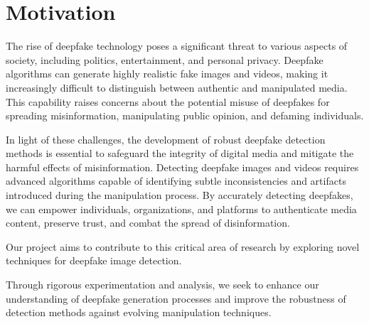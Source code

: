 \section{Motivation}
\vspace{1.5 cm}
The rise of deepfake technology poses a significant threat to various aspects of society, including politics, entertainment, and personal privacy. Deepfake algorithms can generate highly realistic fake images and videos, making it increasingly difficult to distinguish between authentic and manipulated media. This capability raises concerns about the potential misuse of deepfakes for spreading misinformation, manipulating public opinion, and defaming individuals.
\vspace{1.0cm}

In light of these challenges, the development of robust deepfake detection methods is essential to safeguard the integrity of digital media and mitigate the harmful effects of misinformation. Detecting deepfake images and videos requires advanced algorithms capable of identifying subtle inconsistencies and artifacts introduced during the manipulation process. By accurately detecting deepfakes, we can empower individuals, organizations, and platforms to authenticate media content, preserve trust, and combat the spread of disinformation.
\vspace{1.0cm}

Our project aims to contribute to this critical area of research by exploring novel techniques for deepfake image detection.

\vspace{1.0cm}
Through rigorous experimentation and analysis, we seek to enhance our understanding of deepfake generation processes and improve the robustness of detection methods against evolving manipulation techniques.